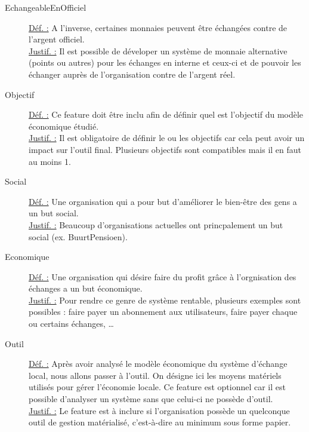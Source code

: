 \begin{description}
\item [EchangeableEnOfficiel]
\underline{Déf. :}  A l'inverse,  certaines monnaies peuvent être échangées contre de l'argent officiel.
\\ \underline{Justif. :}  Il est possible de déveloper un système de monnaie alternative (points ou autres) pour les échanges en interne et ceux-ci et de pouvoir les échanger auprès de l'organisation contre de l'argent réel.
\newline

\begin{center}
\end{center}

\item [Objectif]
\underline{Déf. :}  Ce feature doit être inclu afin de définir quel est l'objectif du modèle économique étudié.
\\ \underline{Justif. :}  Il est obligatoire de définir le ou les objectifs car cela peut avoir un impact sur l'outil final.  Plusieurs objectifs sont compatibles mais il en faut au moins 1.
\newline

\item [Social]
\underline{Déf. :}  Une organisation qui a pour but d'améliorer le bien-être des gens a un but social.
\\ \underline{Justif. :}  Beaucoup d'organisations actuelles ont princpalement un but social (ex. BuurtPensioen).
\newline

\item [Economique]
\underline{Déf. :}  Une organisation qui désire faire du profit grâce à l'orgnisation des échanges a un but économique.
\\ \underline{Justif. :}  Pour rendre ce genre de système rentable,  plusieurs exemples sont possibles : faire payer un abonnement aux utilisateurs,  faire payer chaque ou certains échanges, \dots
\newline

\item [Outil]
\underline{Déf. :}  Après avoir analysé le modèle économique du système d'échange local,  nous allons passer à l'outil.  On désigne ici les moyens matériels utilisés pour gérer l'économie locale.  Ce feature est optionnel car il est possible d'analyser un système sans que celui-ci ne possède d'outil.  
\\ \underline{Justif. :}  Le feature est à inclure si l'organisation possède un quelconque outil de gestion matérialisé,  c'est-à-dire au minimum sous forme papier.
\newline


\end{description}
